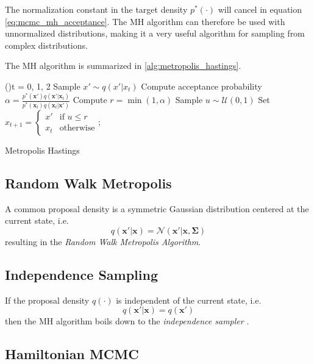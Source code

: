 The normalization constant in the target density $p^*(\cdot)$ will cancel in equation \eqref{eq:mcmc_mh_acceptance}. The MH algorithm can therefore be used with unnormalized distributions, making it a very useful algorithm for sampling from complex distributions. 

The MH algorithm is summarized in \cref{alg:metropolis_hastings}.
\begin{algorithm}
\SetAlgoLined
\For(){t = 0, 1, 2}{
    Sample $x' \sim q(x' | x_t)$ \;
    Compute acceptance probability \\
    $\alpha = \frac{p^*(\mathbf{x'}) q(\mathbf{x'} | \mathbf{x}_t)}{p^*(\mathbf{x}_t) q(\mathbf{x}_t | \mathbf{x'})}$\;
    Compute $r = \min(1, \alpha)$\;
    Sample $u \sim \mathcal{U}(0, 1)$\;
    Set $x_{t+1} = \begin{cases}x' & \text{if } u \leq r\\x_t & \text{otherwise}\end{cases}$;
}
\caption{Metropolis Hastings}
\label{alg:metropolis_hastings}
\end{algorithm}

\subsection{Random Walk Metropolis}\label{sec:random_walk_metropolis}
A common proposal density is a symmetric Gaussian distribution centered at the current state, i.e. $$q(\mathbf{x'} | \mathbf{x}) = \mathcal{N}(\mathbf{x'} | \mathbf{x}, \boldsymbol{\Sigma})$$ resulting in the \textit{Random Walk Metropolis Algorithm}.

\subsection{Independence Sampling}
If the proposal density $q(\cdot)$ is independent of the current state, i.e. $$q(\mathbf{x'} | \mathbf{x}) = q(\mathbf{x'})$$ then the MH algorithm boils down to the \textit{independence sampler} \cite{murphy}.

\subsection{Hamiltonian MCMC}

